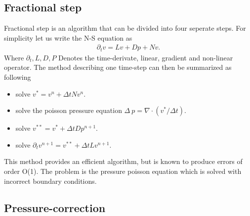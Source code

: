 \subsection{Fractional step}
Fractional step is an algorithm that can be divided into four seperate steps. For simplicity let us write the N-S
equation as 
\begin{align}
    \partial_t v = Lv + Dp + Nv.
    \label{eq:NSfracstep}
\end{align}
Where $\partial_t, L,D,P$ Denotes the time-derivate, linear, gradient and non-linear operator. 
The method describing one time-step can then be summarized as following
\begin{itemize}
    \item solve $v^* = v^n + \Delta t Nv^n$.
    \item solve the poisson pressure equation $\Delta\: p = \nabla \cdot (v^*/\Delta t)$.
    \item solve $v^{**} =v^* + \Delta t Dp^{n+1}$.
    \item solve $\partial_t v^{n+1}=v^{**} + \Delta t Lv^{n+1}$.
\end{itemize}
This method provides an efficient algorithm, but is known to produce errors of order O(1).
The problem is the pressure poisson equation which is solved with incorrect boundary 
conditions.
\subsection{Pressure-correction}



